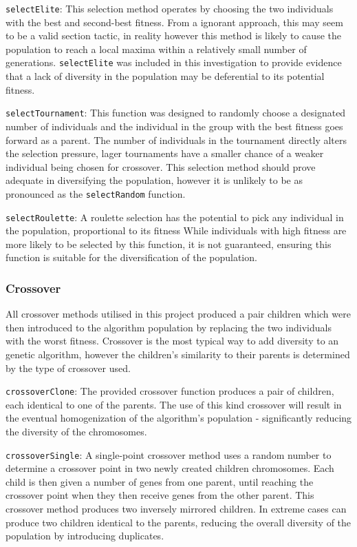 			\texttt{selectElite}: This selection method operates by choosing the two individuals with the best and second-best fitness. From a ignorant approach, this may seem to be a valid section tactic, in reality however this method is likely to cause the population to reach a local maxima within a relatively small number of generations. \texttt{selectElite} was included in this investigation to provide evidence that a lack of diversity in the population may be deferential to its potential fitness.
			
			\texttt{selectTournament}: This function was designed to randomly choose a designated number of individuals and the individual in the group with the best fitness goes forward as a parent. The number of individuals in the tournament directly alters the selection pressure, lager tournaments have a smaller chance of a weaker individual being chosen for crossover. This selection method should prove adequate in diversifying the population, however it is unlikely to be as pronounced as the \texttt{selectRandom} function.
			
			\texttt{selectRoulette}: A roulette selection has the potential to pick any individual in the population, proportional to its fitness  While individuals with high fitness are more likely to be selected by this function, it is not guaranteed, ensuring this function is suitable for the diversification of the population.
		
		\subsubsection{Crossover}
			All  crossover methods utilised in this project produced a pair children which were then introduced to the algorithm population by replacing the two individuals with the worst fitness. Crossover is the most typical way to add diversity to an genetic algorithm, however the children's similarity to their parents is determined by the type of crossover used.			
	
			\texttt{crossoverClone}: The provided crossover function produces a pair of children, each identical to one of the parents. The use of this kind crossover will result in the eventual homogenization of the algorithm's population - significantly reducing the diversity of the chromosomes. 
		
			\texttt{crossoverSingle}: A single-point crossover method uses a random number to determine a crossover point in two newly created children chromosomes. Each child is then given a number of genes from one parent, until reaching the crossover point when they then receive genes from the other parent. This crossover method produces two inversely mirrored children. In extreme cases can produce two children identical to the parents, reducing the overall diversity of the population by introducing duplicates. 
			
